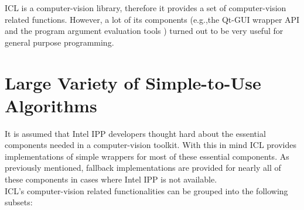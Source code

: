  ICL is a computer-vision library, therefore it provides a set of computer-vision related functions. However, a lot of its components (e.g.,the Qt-GUI wrapper API  and the program argument evaluation tools ) turned out to be very useful for general purpose programming. 

\section{Large Variety of Simple-to-Use Algorithms}
It is assumed that Intel IPP developers thought hard about the essential components needed in a computer-vision toolkit. With this in mind ICL provides implementations of simple wrappers for most of these essential components. As previously mentioned, fallback implementations are provided for nearly all of these components in cases where Intel IPP is not available.\\
ICL's computer-vision related functionalities can be grouped into the following subsets:  

